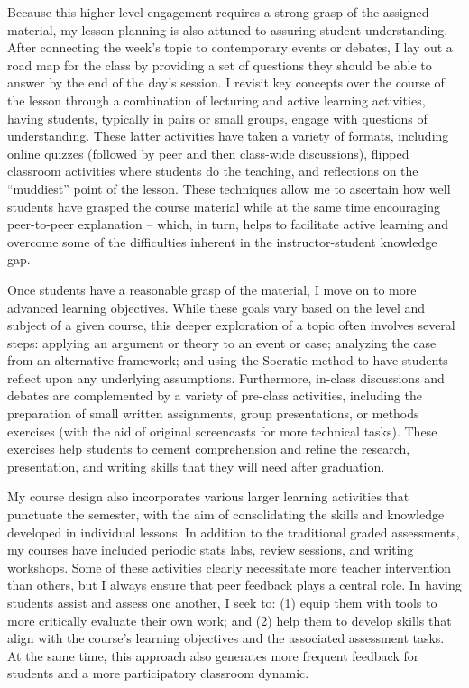 \documentclass[letterpaper]{scrartcl}
\begin{document}
Because this higher-level engagement requires a strong grasp of the assigned material, my lesson planning is also attuned to assuring student understanding. After connecting the week's topic to contemporary events or debates, I lay out a road map for the class by providing a set of questions they should be able to answer by the end of the day's session. I revisit key concepts over the course of the lesson through a combination of lecturing and active learning activities, having students, typically in pairs or small groups, engage with questions of understanding. These latter activities have taken a variety of formats, including online quizzes (followed by peer and then class-wide discussions), flipped classroom activities where students do the teaching, and reflections on the ``muddiest'' point of the lesson. These techniques allow me to ascertain how well students have grasped the course material while at the same time encouraging peer-to-peer explanation -- which, in turn, helps to facilitate active learning and overcome some of the difficulties inherent in the instructor-student knowledge gap.

Once students have a reasonable grasp of the material, I move on to more advanced learning objectives. While these goals vary based on the level and subject of a given course, this deeper exploration of a topic often involves several steps: applying an argument or theory to an event or case; analyzing the case from an alternative framework; and using the Socratic method to have students reflect upon any underlying assumptions. Furthermore, in-class discussions and debates are complemented by a variety of pre-class activities, including the preparation of small written assignments, group presentations, or methods exercises (with the aid of original screencasts for more technical tasks). These exercises help students to cement comprehension and refine the research, presentation, and writing skills that they will need after graduation.

My course design also incorporates various larger learning activities that punctuate the semester, with the aim of consolidating the skills and knowledge developed in individual lessons. In addition to the traditional graded assessments, my courses have included periodic stats labs, review sessions, and writing workshops. Some of these activities clearly necessitate more teacher intervention than others, but I always ensure that peer feedback plays a central role. In having students assist and assess one another, I seek to: (1) equip them with tools to more critically evaluate their own work; and (2) help them to develop skills that align with the course's learning objectives and the associated assessment tasks. At the same time, this approach also generates more frequent feedback for students and a more participatory classroom dynamic.
\end{document}
